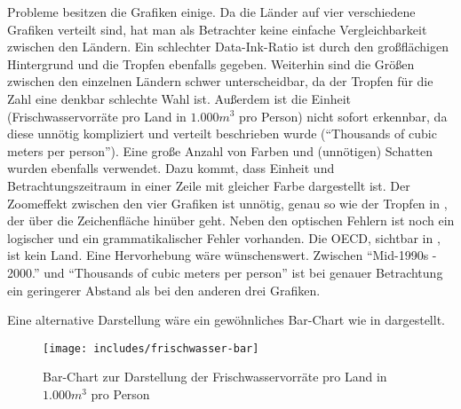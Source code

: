 \documentclass[a4paper,12pt,ngerman]{scrartcl}
\begin{document}
Probleme besitzen die Grafiken einige. Da die Länder auf vier verschiedene Grafiken verteilt sind, hat man als Betrachter keine einfache Vergleichbarkeit zwischen den Ländern. Ein schlechter Data-Ink-Ratio ist durch den großflächigen Hintergrund und die Tropfen ebenfalls gegeben. Weiterhin sind die Größen zwischen den einzelnen Ländern schwer unterscheidbar, da der Tropfen für die Zahl eine denkbar schlechte Wahl ist. Außerdem ist die Einheit (Frischwasservorräte pro Land in $1.000 m^3$ pro Person) nicht sofort erkennbar, da diese unnötig kompliziert und verteilt beschrieben wurde (\enquote{Thousands of cubic meters per person}). Eine große Anzahl von Farben und (unnötigen) Schatten wurden ebenfalls verwendet. Dazu kommt, dass Einheit und Betrachtungszeitraum in einer Zeile mit gleicher Farbe dargestellt ist. Der Zoomeffekt zwischen den vier Grafiken ist unnötig, genau so wie der Tropfen in , der über die Zeichenfläche hinüber geht. Neben den optischen Fehlern ist noch ein logischer und ein grammatikalischer Fehler vorhanden. Die OECD, sichtbar in , ist kein Land. Eine Hervorhebung wäre wünschenswert. Zwischen \enquote{Mid-1990s - 2000.} und \enquote{Thousands of cubic meters per person} ist bei genauer Betrachtung ein geringerer Abstand als bei den anderen drei Grafiken.

Eine alternative Darstellung wäre ein gewöhnliches Bar-Chart wie in  dargestellt.

\begin{figure}
    \centering
    \texttt{[image: includes/frischwasser-bar]}
    \caption{Bar-Chart zur Darstellung der Frischwasservorräte pro Land in $1.000 m^3$ pro Person}
    \label{frischwasser-bar}
\end{figure}
\end{document}
